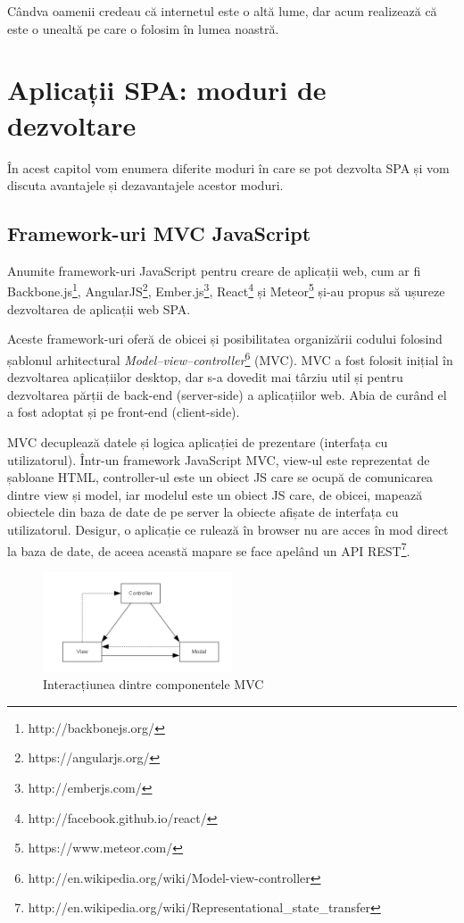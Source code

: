 \begin{savequote}[75mm]
Cândva oamenii credeau că internetul este o altă lume, dar acum realizează
că este o unealtă pe care o folosim în lumea noastră.
\end{savequote}

\chapter{Aplicații SPA: moduri de dezvoltare}
În acest capitol vom enumera diferite moduri în care se pot dezvolta SPA și
vom discuta avantajele și dezavantajele acestor moduri.

\section{Framework-uri MVC JavaScript}
Anumite framework-uri JavaScript pentru creare de aplicații web, cum ar fi
Backbone.js\footnote{http://backbonejs.org/},
AngularJS\footnote{https://angularjs.org/},
Ember.js\footnote{http://emberjs.com/},
React\footnote{http://facebook.github.io/react/} și
Meteor\footnote{https://www.meteor.com/}
și-au propus să ușureze dezvoltarea de aplicații web SPA.

Aceste framework-uri oferă de obicei și posibilitatea organizării codului
folosind șablonul arhitectural 
\emph{Model–view–controller}\footnote{http://en.wikipedia.org/wiki/Model-view-controller}
(MVC). MVC a fost
folosit inițial în dezvoltarea aplicațiilor desktop, dar s-a dovedit mai târziu
util și pentru dezvoltarea părții de back-end (server-side) a aplicațiilor web.
Abia de curând el a fost adoptat și pe front-end (client-side).

MVC decuplează datele și logica aplicației de prezentare (interfața cu utilizatorul). Într-un framework JavaScript MVC,
view-ul este reprezentat de șabloane HTML, controller-ul este un obiect JS
care se ocupă de comunicarea dintre view și model, iar modelul este un obiect JS
care, de obicei, mapează obiectele din baza de date de pe server la obiecte
afișate de interfața cu utilizatorul. Desigur, o aplicație ce rulează în browser
nu are acces în mod direct la baza de date, de aceea această mapare se face apelând un
API REST\footnote{http://en.wikipedia.org/wiki/Representational\_state\_transfer}.

\begin{figure}[t]
  \centering
    \includegraphics[width=0.5\textwidth]{./MVC}
  \caption{Interacțiunea dintre componentele MVC}
\end{figure}


